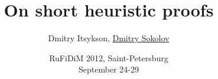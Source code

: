 

\title[\insertframenumber/\inserttotalframenumber~|~
On short heuristic proofs]{On short heuristic proofs}
\author[Sokolov D.O]{Dmitry Itsykson, \underline{Dmitry Sokolov}}

\date{RuFiDiM 2012, Saint-Petersburg \\
	September 24-29}



	\maketitle

	



